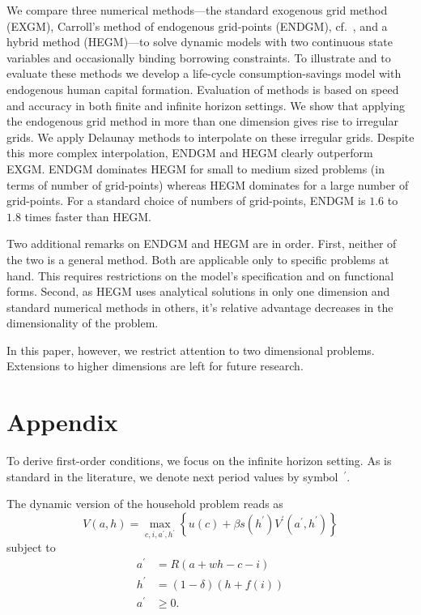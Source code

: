 \documentclass[a4paper,12pt]{article}
\begin{document}
We compare three numerical methods---the standard exogenous grid method (EXGM), Carroll's method of endogenous grid-points (ENDGM), cf.~, and a hybrid method (HEGM)---to solve dynamic models with two continuous state variables and occasionally binding borrowing constraints. To illustrate and to evaluate these methods we develop a life-cycle consumption-savings model with endogenous human capital formation. Evaluation of methods is based on speed and accuracy in both finite and infinite horizon settings. We show that applying the endogenous grid method in more than one dimension gives rise to irregular grids. We apply Delaunay methods to interpolate on these irregular grids. Despite this more complex interpolation, ENDGM and HEGM  clearly outperform EXGM. ENDGM dominates HEGM for small to medium sized problems (in terms of number of grid-points) whereas HEGM dominates for a large number of grid-points. For a standard choice of numbers of grid-points, ENDGM is $1.6$ to~$1.8$ times faster than HEGM.

Two additional remarks on ENDGM and HEGM are in order. First, neither of the two is a general method. Both are applicable only to specific problems at hand. This requires restrictions on the model's specification and on functional forms. Second, as HEGM uses analytical solutions in only one dimension and standard numerical methods in others, it's relative advantage decreases in the dimensionality of the problem.

In this paper, however, we restrict attention to two dimensional problems. Extensions to higher dimensions are left for future research.

\clearpage
\newpage

\section{Appendix}

\label{app:equations}

To derive first-order conditions, we focus on the infinite horizon setting. As is standard in the literature, we denote next period values by symbol~$^{\prime}$.

The dynamic version of the household problem reads as
\[
	V(a,h) = \underset{c,i,a^{\prime},h^{\prime}}{\max}\left\{u(c) + \beta s\left(h^{\prime}\right) V^{\prime}(a^{\prime},h^{\prime})\right\}
\]
subject to
\begin{align*}
	a^{\prime}  &  = R\left(a + wh - c - i\right)  \\
	h^{\prime}  &  = \left(1 - \delta\right) \left(h + f\left(i\right)\right)  \\
	a^{\prime}  &  \geq0.
\end{align*}
\end{document}
